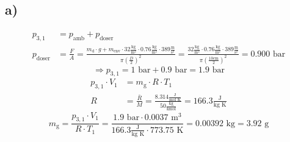 

\subsection*{a)}
\begin{align*}
    p_{3,1} &= p_{\text{amb}} + p_{\text{doser}} \\
    p_{\text{doser}} &= \frac{F}{A} = \frac{m_{\text{d}} \cdot g + m_{\text{env}} \cdot 32 \frac{\text{kg}}{\text{m}^2} \cdot 0.76 \frac{\text{kg}}{\text{m}^2} \cdot 389 \frac{\text{m}}{\text{s}^2}}{\pi \left( \frac{D}{2} \right)^2} = \frac{32 \frac{\text{kg}}{\text{m}^2} \cdot 0.76 \frac{\text{kg}}{\text{m}^2} \cdot 389 \frac{\text{m}}{\text{s}^2}}{\pi \left( \frac{10 \text{cm}}{2} \right)^2} = 0.900 \text{ bar}
\end{align*}
\[
\Rightarrow p_{3,1} = 1 \text{ bar} + 0.9 \text{ bar} = 1.9 \text{ bar}
\]
\begin{align*}
    p_{3,1} \cdot V_1 &= m_{\text{g}} \cdot R \cdot T_1 \\
    R &= \frac{\bar{R}}{M} = \frac{8.314 \frac{\text{J}}{\text{mol K}}}{50 \frac{\text{kg}}{\text{kmol}}} = 166.3 \frac{\text{J}}{\text{kg K}}
\end{align*}
\[
m_{\text{g}} = \frac{p_{3,1} \cdot V_1}{R \cdot T_1} = \frac{1.9 \text{ bar} \cdot 0.0037 \text{ m}^3}{166.3 \frac{\text{J}}{\text{kg K}} \cdot 773.75 \text{ K}} = 0.00392 \text{ kg} = 3.92 \text{ g}
\]
